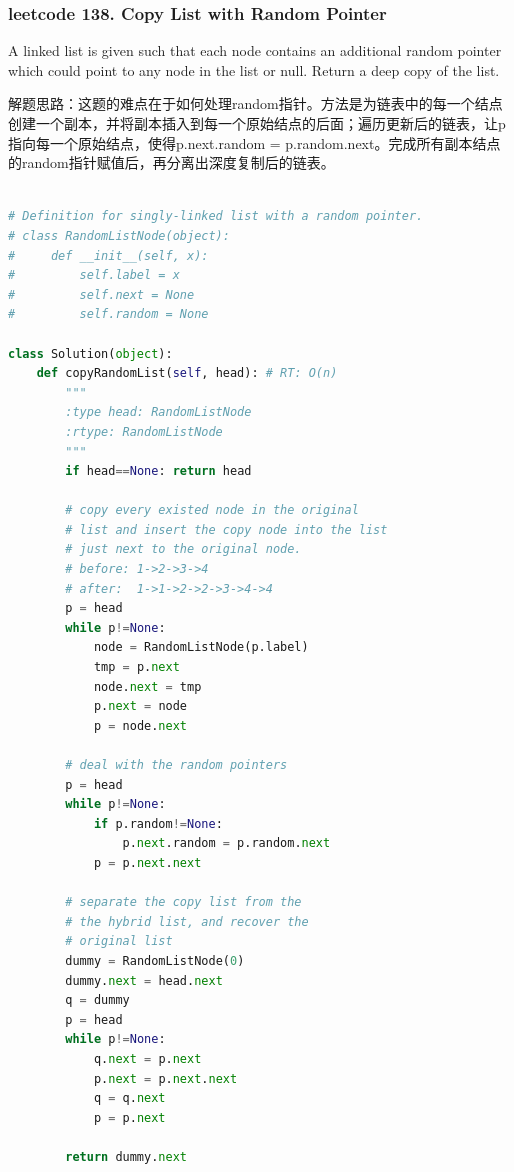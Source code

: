 \documentclass[a4paper,10pt]{article}
\begin{document}
\subsubsection{leetcode 138. Copy List with Random Pointer}
A linked list is given such that each node contains an additional random pointer which could point to any node in the list or null. Return a deep copy of the list. \\

\begin{CJK*}{UTF8}{gbsn}
\noindent 解题思路：这题的难点在于如何处理random指针。方法是为链表中的每一个结点创建一个副本，并将副本插入到每一个原始结点的后面；遍历更新后的链表，让p指向每一个原始结点，使得p.next.random = p.random.next。完成所有副本结点的random指针赋值后，再分离出深度复制后的链表。\\
\end{CJK*}

\begin{lstlisting}[language=Python, caption=Problem138. Copy List with Random Pointer]

# Definition for singly-linked list with a random pointer.
# class RandomListNode(object):
#     def __init__(self, x):
#         self.label = x
#         self.next = None
#         self.random = None

class Solution(object):
    def copyRandomList(self, head): # RT: O(n)
        """
        :type head: RandomListNode
        :rtype: RandomListNode
        """
        if head==None: return head
        
        # copy every existed node in the original
        # list and insert the copy node into the list
        # just next to the original node.
        # before: 1->2->3->4
        # after:  1->1->2->2->3->4->4
        p = head
        while p!=None:
            node = RandomListNode(p.label)
            tmp = p.next
            node.next = tmp
            p.next = node
            p = node.next
        
        # deal with the random pointers
        p = head
        while p!=None:
            if p.random!=None:
                p.next.random = p.random.next
            p = p.next.next
        
        # separate the copy list from the 
        # the hybrid list, and recover the
        # original list
        dummy = RandomListNode(0)
        dummy.next = head.next
        q = dummy
        p = head
        while p!=None:
            q.next = p.next
            p.next = p.next.next
            q = q.next
            p = p.next
            
        return dummy.next
\end{lstlisting}
\end{document}
